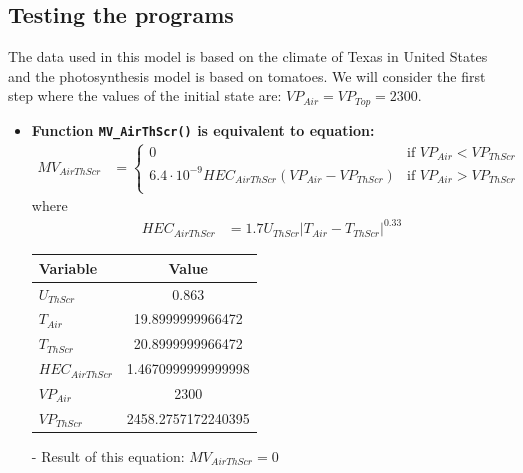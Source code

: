 \documentclass[a4paper]{article}
\numberwithin{equation}{section}
\begin{document}
\subsection{Testing the programs}
The data used in this model is based on the climate of Texas in United States and the photosynthesis model is based on tomatoes.
We will consider the first step where the values of the initial state are: \( VP_{Air} = VP_{Top} = 2300 \).
\begin{itemize}
  \item \textbf{Function \texttt{MV\_AirThScr()} is equivalent to equation:}
        \begin{align*}
          MV_{AirThScr} & = \begin{cases}
            0                                                       & \text{if~} VP_{Air} < VP_{ThScr} \\
            6.4 \cdot 10^{-9} HEC_{AirThScr}(VP_{Air} - VP_{ThScr}) & \text{if~} VP_{Air} > VP_{ThScr} \\
          \end{cases}
        \end{align*}
        where
        \begin{align*}
          HEC_{AirThScr} & = 1.7 U_{ThScr} |T_{Air} - T_{ThScr}|^{0.33}
        \end{align*}

        \begin{table}[H]
          \centering
          \begin{tabular}{@{}lS[table-format=4.17]@{}}
            \toprule
            \textbf{Variable}  & \textbf{Value}     \\
            \midrule
            \( U_{ThScr} \)      & 0.863              \\
            \( T_{Air} \)        & 19.8999999966472   \\
            \( T_{ThScr} \)      & 20.8999999966472   \\
            \( HEC_{AirThScr} \) & 1.4670999999999998 \\
            \( VP_{Air} \)       & 2300               \\
            \( VP_{ThScr} \)     & 2458.2757172240395 \\
            \bottomrule
          \end{tabular}
        \end{table}

  \item[-] Result of this equation: \( MV_{AirThScr} = 0 \)


\end{itemize}
\end{document}

